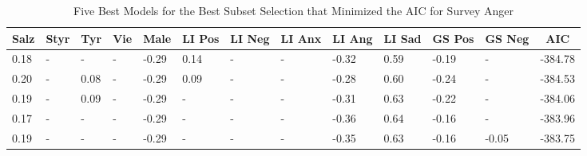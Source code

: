 \documentclass[
  english,
  jou,floatsintext]{apa7}
\begin{document}
\begin{table}[h]

\begin{center}
\begin{threeparttable}

\caption{\label{tab:subset-detail}Five Best Models for the Best Subset Selection that Minimized the AIC for Survey Anger}

\small{

\begin{tabular}{lllllllllllll}
\toprule
Salz & \multicolumn{1}{c}{Styr} & \multicolumn{1}{c}{Tyr} & \multicolumn{1}{c}{Vie} & \multicolumn{1}{c}{Male} & \multicolumn{1}{c}{LI Pos} & \multicolumn{1}{c}{LI Neg} & \multicolumn{1}{c}{LI Anx} & \multicolumn{1}{c}{LI Ang} & \multicolumn{1}{c}{LI Sad} & \multicolumn{1}{c}{GS Pos} & \multicolumn{1}{c}{GS Neg} & \multicolumn{1}{c}{AIC}\\
\midrule
0.18 & - & - & - & -0.29 & 0.14 & - & - & -0.32 & 0.59 & -0.19 & - & -384.78\\
0.20 & - & 0.08 & - & -0.29 & 0.09 & - & - & -0.28 & 0.60 & -0.24 & - & -384.53\\
0.19 & - & 0.09 & - & -0.29 & - & - & - & -0.31 & 0.63 & -0.22 & - & -384.06\\
0.17 & - & - & - & -0.29 & - & - & - & -0.36 & 0.64 & -0.16 & - & -383.96\\
0.19 & - & - & - & -0.29 & - & - & - & -0.35 & 0.63 & -0.16 & -0.05 & -383.75\\
\bottomrule
\end{tabular}

}

\end{threeparttable}
\end{center}

\end{table}
\end{document}

